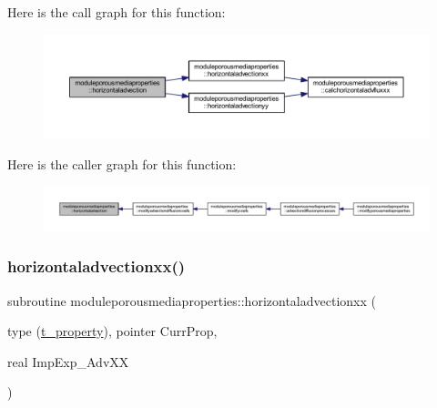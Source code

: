 Here is the call graph for this function\+:\nopagebreak
\begin{figure}[H]
\begin{center}
\leavevmode
\includegraphics[width=350pt]{namespacemoduleporousmediaproperties_a7327a640c1b4db8bbf9db21d1a859a88_cgraph}
\end{center}
\end{figure}
Here is the caller graph for this function\+:\nopagebreak
\begin{figure}[H]
\begin{center}
\leavevmode
\includegraphics[width=350pt]{namespacemoduleporousmediaproperties_a7327a640c1b4db8bbf9db21d1a859a88_icgraph}
\end{center}
\end{figure}
\mbox{\label{namespacemoduleporousmediaproperties_a8e5f48df8b88839f3c864bb3668c251a}} 
\subsubsection{\texorpdfstring{horizontaladvectionxx()}{horizontaladvectionxx()}}
{\footnotesize\ttfamily subroutine moduleporousmediaproperties\+::horizontaladvectionxx (\begin{DoxyParamCaption}\item[{type (\mbox{\hyperlink{structmoduleporousmediaproperties_1_1t__property}{t\+\_\+property}}), pointer}]{Curr\+Prop,  }\item[{real}]{Imp\+Exp\+\_\+\+Adv\+XX }\end{DoxyParamCaption})\hspace{0.3cm}{\ttfamily [private]}}


